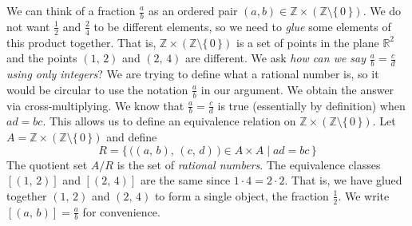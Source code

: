 \documentclass{article}
\theoremstyle{plain}
\theoremstyle{normal}
\newenvironment{example}{%
    \pushQED{\qed}\renewcommand{\qedsymbol}{$\blacksquare$}\examplex%
}{%
    \popQED\endexamplex%
}
\begin{document}
        \begin{example}
            We can think of a fraction $\frac{a}{b}$ as an ordered pair
            $(a,b)\in\mathbb{Z}\times(\mathbb{Z}\setminus\{\,0\,\})$. We do not
            want $\frac{1}{2}$ and $\frac{2}{4}$ to be different elements, so
            we need to \textit{glue} some elements of this product together.
            That is, $\mathbb{Z}\times(\mathbb{Z}\setminus\{\,0\,\})$ is a set
            of points in the plane $\mathbb{R}^{2}$ and the points
            $(1,\,2)$ and $(2,\,4)$ are different. We ask
            \textit{how can we say} $\frac{a}{b}=\frac{c}{d}$
            \textit{using only integers}? We are trying to define what a
            rational number is, so it would be circular to use the notation
            $\frac{a}{b}$ in our argument. We obtain the answer via
            cross-multiplying. We know that $\frac{a}{b}=\frac{c}{d}$ is true
            (essentially by definition) when $ad=bc$. This allows us to define
            an equivalence relation on
            $\mathbb{Z}\times(\mathbb{Z}\setminus\{\,0\,\})$. Let
            $A=\mathbb{Z}\times(\mathbb{Z}\setminus\{\,0\,\})$ and define
            \begin{equation}
                R=\{\,\big((a,\,b),\,(c,\,d)\,\big)\in{A}\times{A}\;|\;
                    ad=bc\,\}
            \end{equation}
            The quotient set $A/R$ is the set of \textit{rational numbers}.
            The equivalence classes $[(1,\,2)]$ and $[(2,\,4)]$ are the same
            since $1\cdot{4}=2\cdot{2}$. That is, we have glued together
            $(1,\,2)$ and $(2,\,4)$ to form a single object, the fraction
            $\frac{1}{2}$. We write $[(a,\,b)]=\frac{a}{b}$ for convenience.
        \end{example}
\end{document}
